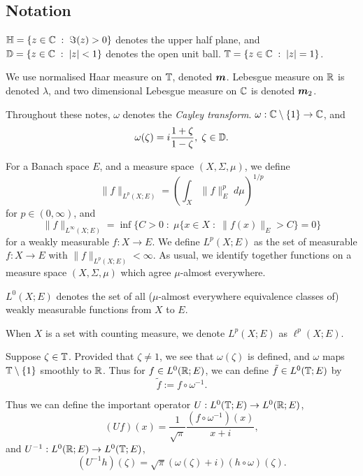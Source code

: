 \subsection{Notation}
$\mathbb{H} = \{z \in \mathbb{C}\;:\;\Im(z) > 0\}$ denotes the upper half plane,
and $\mathbb{D} = \{z\in \mathbb{C}\;:\; |z| < 1\}$ denotes the open unit ball.
$\mathbb{T} = \{z \in \mathbb{C}\;:\; |z| = 1\}$.

We use normalised Haar measure on $\mathbb{T}$, denoted $\boldsymbol{m}$. Lebesgue
measure on $\mathbb{R}$ is denoted $\lambda$, and two dimensional Lebesgue measure on
$\mathbb{C}$ is denoted $\boldsymbol{m}_2$.

Throughout these notes, $\omega$ denotes the \emph{Cayley transform}.
$\omega:\mathbb{C}\setminus\{1\}\rightarrow \mathbb{C}$, and 
\begin{equation}
    \omega(\zeta) = i\frac{1+\zeta}{1-\zeta},\;\zeta \in \mathbb{D}.
\end{equation}

For a Banach space $E$, and a measure space $(X,\Sigma,\mu)$, we define
\begin{equation}
    \|f\|_{L^p(X;E)} = \left(\int_X \|f\|_E^p \;d\mu\right)^{1/p}
\end{equation}
for $p \in (0,\infty)$, and
\begin{equation}
    \|f\|_{L^\infty(X;E)} = \inf\{C > 0 \;:\; \mu\{x \in X \;:\; \|f(x)\|_E > C\} = 0\}
\end{equation}
for a weakly measurable $f:X\rightarrow E$. We define $L^p(X;E)$ as the set
of measurable $f:X\rightarrow E$ with $\|f\|_{L^p(X;E)} < \infty$. As usual, 
we identify together functions on a measure space $(X,\Sigma,\mu)$ 
which agree $\mu$-almost everywhere.

$L^0(X;E)$ denotes the set of all ($\mu$-almost everywhere equivalence classes of)
weakly measurable functions from $X$ to $E$.

When $X$ is a set with counting measure, we denote $L^p(X;E)$ as $\ell^p(X;E)$.

Suppose $\zeta \in \mathbb{T}$. Provided that $\zeta \neq 1$, we see that $\omega(\zeta)$
is defined, and $\omega$ maps $\mathbb{T}\setminus\{1\}$ smoothly to $\mathbb{R}$. Thus for
$f \in L^0(\mathbb{R};E)$, we can define $\tilde{f} \in L^0(\mathbb{T};E)$
by 
\begin{equation}
    \tilde{f} := f\circ \omega^{-1}.
\end{equation}

Thus we can define the important operator $U:L^0(\mathbb{T};E)\rightarrow L^0(\mathbb{R};E)$,
\begin{equation}
    (U f)(x) = \frac{1}{\sqrt{\pi}}\frac{(f\circ \omega^{-1})(x)}{x+i},
\end{equation}
and $U^{-1}:L^0(\mathbb{R};E)\to L^0(\mathbb{T};E)$,
\begin{equation}
        (U^{-1}h)(\zeta) = \sqrt{\pi}(\omega(\zeta)+i)(h\circ\omega)(\zeta).
\end{equation}


